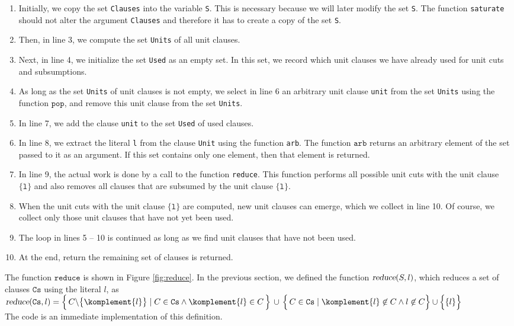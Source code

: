 \begin{enumerate}
\item Initially, we copy the set \texttt{Clauses} into the variable \texttt{S}.
      This is necessary because we will later modify the set \texttt{S}. The function
      \texttt{saturate} should not alter the argument \texttt{Clauses} and therefore
      it has to create a copy of the set \texttt{S}.
\item Then, in line 3, we compute the set \texttt{Units} of all unit clauses.
\item Next, in line 4, we initialize the set \texttt{Used} as an empty set.
      In this set, we record which unit clauses we have already used for unit cuts and
      subsumptions.
\item As long as the set \texttt{Units} of unit clauses is not empty, we select in line 6
      an arbitrary unit clause \texttt{unit} from the set \texttt{Units} using the function $\texttt{pop}$, and remove this unit clause from the set \texttt{Units}.
\item In line 7, we add the clause \texttt{unit} to the set
      \texttt{Used} of used clauses.
\item In line 8, we extract the literal \texttt{l} from the clause
      \texttt{Unit} using the function \texttt{arb}. The function $\texttt{arb}$ returns an arbitrary element of the set passed to it as an argument. If this set contains only one element, then
      that element is returned.
\item In line 9, the actual work is done by a call to the function
      \texttt{reduce}. This function performs all possible unit cuts with the
      unit clause $\{\texttt{l}\}$ and also removes all clauses that
      are subsumed by the unit clause $\{\texttt{l}\}$.
\item When the unit cuts with the unit clause $\{\texttt{l}\}$ are computed, new
      unit clauses can emerge, which we collect in line 10.  Of course, we collect only those unit clauses
      that have not yet been used.
\item The loop in lines 5 -- 10 is continued as long as we
      find unit clauses that have not been used.
\item At the end,  return the remaining set of clauses is returned.
\end{enumerate}
The function $\texttt{reduce}$  is shown in Figure \ref{fig:reduce}.
In the previous section, we defined the function $\textsl{reduce}(S, l)$, which reduces a
set of clauses $\texttt{Cs}$ using the literal $l$, as
\\[0.2cm]
\hspace*{1.3cm}
$\textsl{reduce}(\texttt{Cs},l)  = 
 \Bigl\{\, C \backslash \bigl\{\komplement{l}\bigr\} \;|\; C \in \texttt{Cs} \wedge \komplement{l} \in C \,\Bigr\} 
       \,\cup\, \Bigl\{\, C \in \texttt{Cs} \mid \komplement{l} \not\in C \wedge l \not\in C \Bigr\} \cup \Bigl\{\{l\}\Bigr\}
$
\\[0.2cm]
The code is an immediate implementation of this definition.

